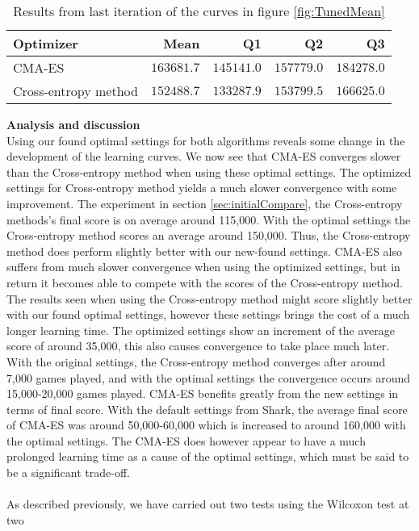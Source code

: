 \begin{table}[H]
\centering
\small
\begin{tabular}{l r r r r}
Optimizer & Mean & Q1 & Q2 & Q3\\
\hline
CMA-ES  & $163681.7$ & $145141.0$ & $157779.0$ & $184278.0$\\
Cross-entropy method & $152488.7$ & $133287.9$ & $153799.5$ & $166625.0$\\
\end{tabular}
\caption{Results from last iteration of the curves in figure \ref{fig:TunedMean}
\label{table:tunedResultTable}}
\end{table}
\vspace{0.5cm}
\textbf{Analysis and discussion}\\
Using our found optimal settings for both algorithms reveals some change in the 
development of the learning curves. We now see that CMA-ES converges slower than
the Cross-entropy method when using these optimal settings. 
The optimized settings for Cross-entropy method yields a much slower convergence
with some improvement. The experiment in section \ref{sec:initialCompare}, the Cross-entropy
methods's final score is on average around 115,000. With the optimal settings
the Cross-entropy method scores an average around 150,000. Thus, the Cross-entropy 
method does perform slightly better with our new-found settings.
CMA-ES also suffers from much slower convergence 
when using the optimized settings, but in return it becomes able to compete with
the scores of the Cross-entropy method. The results seen when using the Cross-entropy
method  might
score slightly better with our found optimal settings, however these settings
brings the cost of a much longer learning time. The optimized settings show
an increment of the average score of around 35,000, this also causes convergence to
take place much later. With the original settings, the Cross-entropy method converges 
after around 7,000 games played, and with the optimal settings the convergence 
occurs around 15,000-20,000 games played.
CMA-ES benefits greatly from the new settings in terms of final score.
With the default settings from Shark, the average final score of CMA-ES was around
50,000-60,000 which is increased to around 160,000 with the optimal settings.
The CMA-ES does however appear to have a much prolonged learning time
as a cause of the optimal settings, which must be said to be a significant trade-off.\\
\\
As described previously, we have carried out two tests using the Wilcoxon test at two 
